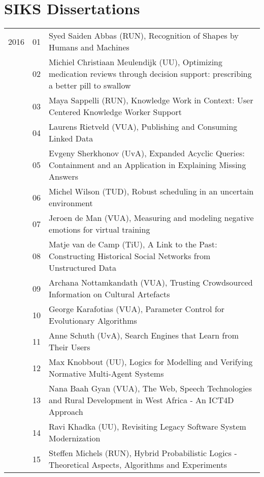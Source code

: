 
\chapter*{SIKS Dissertations}

\begin{xltabular}{\linewidth}{@{} l @{\hspace{0.5em}} l @{\hspace{1em}} X @{}}

2016
	&	 01	&	 Syed Saiden Abbas (RUN), Recognition of Shapes by Humans and Machines\\
	&	 02	&	 Michiel Christiaan Meulendijk (UU), Optimizing medication reviews through decision support: prescribing a better pill to swallow\\
	&	 03	&	 Maya Sappelli (RUN), Knowledge Work in Context: User Centered Knowledge Worker Support\\
	&	 04	&	 Laurens Rietveld (VUA), Publishing and Consuming Linked Data\\
	&	 05	&	 Evgeny Sherkhonov (UvA), Expanded Acyclic Queries: Containment and an Application in Explaining Missing Answers\\
	&	 06	&	 Michel Wilson (TUD), Robust scheduling in an uncertain environment\\
	&	 07	&	 Jeroen de Man (VUA), Measuring and modeling negative emotions for virtual training\\
	&	 08	&	 Matje van de Camp (TiU), A Link to the Past: Constructing Historical Social Networks from Unstructured Data\\
	&	 09	&	 Archana Nottamkandath (VUA), Trusting Crowdsourced Information on Cultural Artefacts\\
	&	 10	&	 George Karafotias (VUA), Parameter Control for Evolutionary Algorithms\\
	&	 11	&	 Anne Schuth (UvA), Search Engines that Learn from Their Users\\
	&	 12	&	 Max Knobbout (UU), Logics for Modelling and Verifying Normative Multi-Agent Systems\\
	&	 13	&	 Nana Baah Gyan (VUA), The Web, Speech Technologies and Rural Development in West Africa - An ICT4D Approach\\
	&	 14	&	 Ravi Khadka (UU), Revisiting Legacy Software System Modernization\\
	&	 15	&	 Steffen Michels (RUN), Hybrid Probabilistic Logics - Theoretical Aspects, Algorithms and Experiments\\

\end{xltabular}
